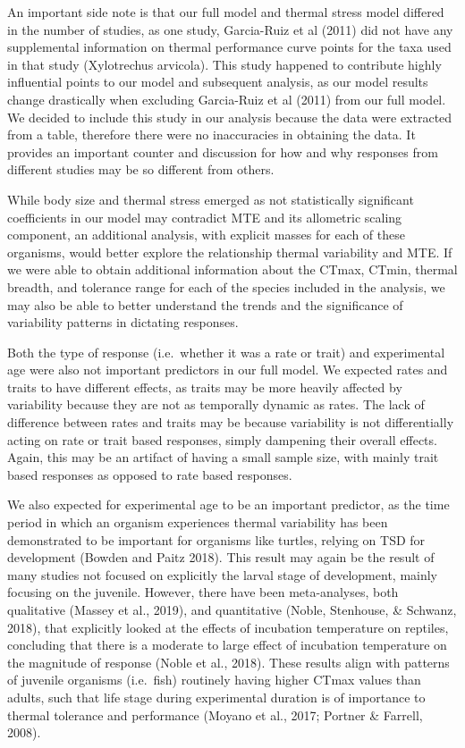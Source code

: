 \documentclass[12pt,twoside]{reedthesis}
\begin{document}
An important side note is that our full model and thermal stress model differed in the number of studies, as one study, Garcia-Ruiz et al (2011) did not have any supplemental information on thermal performance curve points for the taxa used in that study (Xylotrechus arvicola). This study happened to contribute highly influential points to our model and subsequent analysis, as our model results change drastically when excluding Garcia-Ruiz et al (2011) from our full model. We decided to include this study in our analysis because the data were extracted from a table, therefore there were no inaccuracies in obtaining the data. It provides an important counter and discussion for how and why responses from different studies may be so different from others.

While body size and thermal stress emerged as not statistically significant coefficients in our model may contradict MTE and its allometric scaling component, an additional analysis, with explicit masses for each of these organisms, would better explore the relationship thermal variability and MTE. If we were able to obtain additional information about the CTmax, CTmin, thermal breadth, and tolerance range for each of the species included in the analysis, we may also be able to better understand the trends and the significance of variability patterns in dictating responses.

Both the type of response (i.e.~whether it was a rate or trait) and experimental age were also not important predictors in our full model. We expected rates and traits to have different effects, as traits may be more heavily affected by variability because they are not as temporally dynamic as rates. The lack of difference between rates and traits may be because variability is not differentially acting on rate or trait based responses, simply dampening their overall effects. Again, this may be an artifact of having a small sample size, with mainly trait based responses as opposed to rate based responses.

We also expected for experimental age to be an important predictor, as the time period in which an organism experiences thermal variability has been demonstrated to be important for organisms like turtles, relying on TSD for development (Bowden and Paitz 2018). This result may again be the result of many studies not focused on explicitly the larval stage of development, mainly focusing on the juvenile. However, there have been meta-analyses, both qualitative (Massey et al., 2019), and quantitative (Noble, Stenhouse, \& Schwanz, 2018), that explicitly looked at the effects of incubation temperature on reptiles, concluding that there is a moderate to large effect of incubation temperature on the magnitude of response (Noble et al., 2018). These results align with patterns of juvenile organisms (i.e.~fish) routinely having higher CTmax values than adults, such that life stage during experimental duration is of importance to thermal tolerance and performance (Moyano et al., 2017; Portner \& Farrell, 2008).
\end{document}

